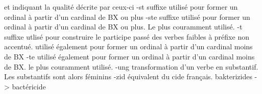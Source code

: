 {             et indiquant la qualité décrite par ceux-ci
-st          suffixe utilisé pour former un ordinal à partir d'un cardinal de BX ou plus
-ste         suffixe utilisé pour former un ordinal à partir d'un cardinal de BX ou plus.
             Le plus couramment utilisé.
-t           suffixe utlisé pour construire le participe passé des verbes faibles
             à préfixe non accentué.
             utilisé également pour former un ordinal à partir d'un cardinal moins de BX
-te          utilisé également pour former un ordinal à partir d'un cardinal moins de BX.
             le plus couramment utilisé.
-ung         transformation d'un verbe en substantif. Les substantifs sont alors féminins
-zid         équivalent du cide français. bakterizides -> bactéricide
}
